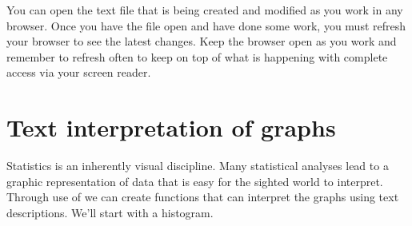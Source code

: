  
You can open the text file that is being created and modified as you work in any browser. Once you have the file open and have done some work, you must  refresh your browser to see the latest changes. Keep the browser open as you work and remember to refresh often to keep on top of what is happening with complete access via your screen reader. 
 
\section{Text interpretation of graphs} 
\label{VIExplained}
 
Statistics is an inherently visual discipline. Many statistical analyses lead to a graphic representation of data that is easy for the sighted world to interpret. Through use of \R{} we can create functions that can interpret the graphs using text descriptions. We'll start with a histogram.  
 
